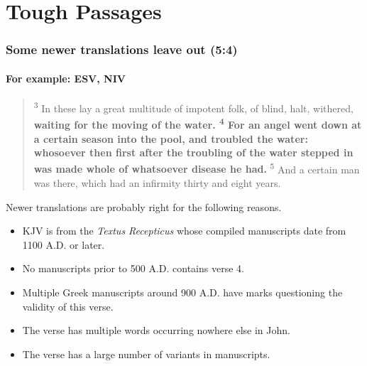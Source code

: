 \documentclass{beamer}
\begin{document}
\section*{Tough Passages}
\begin{frame}
\frametitle{Some newer translations leave out (5:4)}
\framesubtitle{For example: ESV, NIV}

\footnotesize  
\begin{quote}
\textsuperscript{3} In these lay a great multitude of impotent folk, of blind, halt, withered, \textbf{waiting for the moving of the water. \textsuperscript{4} For an angel went down at a certain season into the pool, and troubled the water: whosoever then first after the troubling of the water stepped in was made whole of whatsoever disease he had.} \textsuperscript{5} And a certain man was there, which had an infirmity thirty and eight years.

\end{quote}
\normalsize 
Newer translations are probably right for the following reasons.
\begin{itemize}
\item KJV is from the \textit{Textus Recepticus} whose compiled manuscripts date from 1100 A.D. or later.
\item No manuscripts prior to 500 A.D. contains verse 4.
\item Multiple Greek manuscripts around 900 A.D. have marks questioning the validity of this verse.
\item The verse has multiple words occurring nowhere else in John.
\item The verse has a large number of variants in manuscripts.
\end{itemize}

\end{frame}
\end{document}
